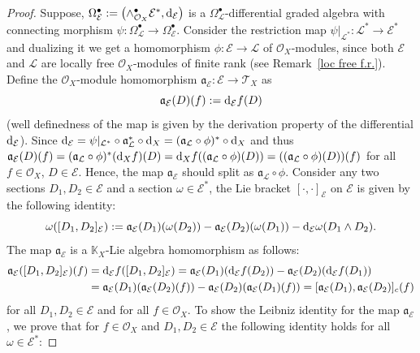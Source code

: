\documentclass[pdftex]{sigma}
\numberwithin{equation}{section}
\theoremstyle{definition}
\begin{document}
\begin{proof}
Suppose, $\Omega^{\bullet}_{\mathcal{E}}:=\bigl(\wedge^{\bullet}_{\mathcal{O}_X}\mathcal{E}^*,{\rm d}_{\mathcal{E}}\bigr)$ is a $\Omega^{\bullet}_{\mathcal{L}}$-differential graded algebra with connecting morphism $\psi\colon \Omega^{\bullet}_{\mathcal{L}} \rightarrow \Omega^{\bullet}_{\mathcal{E}}$.
	Consider the restriction map $ \psi|_{\mathcal{L}^*}\colon \mathcal{L}^* \rightarrow \mathcal{E}^*$ and dualizing it we get a homomorphism $\phi\colon \mathcal{E}\rightarrow \mathcal{L}$ of $\mathcal{O}_X$-modules, since both $\mathcal{E}$ and $\mathcal{L}$ are locally free $\mathcal{O}_X$-modules of finite rank (see Remark~\ref{loc free f.r.}).
	Define the $\mathcal{O}_X$-module homomorphism
	$\mathfrak{a}_{\mathcal{E}}\colon \mathcal{E}\rightarrow \mathcal{T}_X$ as
\[
\mathfrak{a}_{\mathcal{E}}(D)(f):={\rm d}_{\mathcal{E}}f (D)
\]
	(well definedness of the map is given by the derivation property of the differential ${\rm d}_{\mathcal{E}}$).
	Since ${\rm d}_{\mathcal{E}}=\psi|_{\mathcal{L}^*} \circ \mathfrak{a}_{\mathcal{L}}^* \circ {\rm d}_X= (\mathfrak{a}_{\mathcal{L}}\circ \phi)^* \circ {\rm d}_X$ and thus $\mathfrak{a}_{\mathcal{E}}(D)(f)= (\mathfrak{a}_{\mathcal{L}}\circ \phi)^* ({\rm d}_Xf)(D)={\rm d}_Xf((\mathfrak{a}_{\mathcal{L}}\circ \phi)(D))=((\mathfrak{a}_{\mathcal{L}}\circ \phi)(D))(f)$ for all $f \in \mathcal{O}_X$, $D\in \mathcal{E}$. Hence, the map
	$\mathfrak{a}_{\mathcal{E}}$ should split as $\mathfrak{a}_{\mathcal{L}}\circ \phi$.
	Consider any two sections $D_1, D_2 \in \mathcal{E}$ and a section $\omega \in \mathcal{E}^*$, the Lie bracket $[\cdot,\cdot]_{\mathcal{E}}$ on $\mathcal{E}$ is given by the following identity:
\[
\omega([D_1, D_2]_{\mathcal{E}}):= \mathfrak{a}_{\mathcal{E}}(D_1)(\omega(D_2))- \mathfrak{a}_{\mathcal{E}}(D_2)(\omega(D_1))- {\rm d}_{\mathcal{E}}\omega (D_1 \wedge D_2).
\]
	The map $\mathfrak{a}_{\mathcal{E}}$ is a $\mathbb{K}_X$-Lie algebra homomorphism as follows:
\begin{align*}
\mathfrak{a}_{\mathcal{E}}([D_1,D_2]_{\mathcal{E}})(f)&={\rm d}_{\mathcal{E}}f([D_1,D_2]_{\mathcal{E}}) =\mathfrak{a}_{\mathcal{E}}(D_1)({\rm d}_{\mathcal{E}}f(D_2))-\mathfrak{a}_{\mathcal{E}}(D_2)({\rm d}_{\mathcal{E}}f(D_1))\\
& =\mathfrak{a}_{\mathcal{E}}(D_1)(\mathfrak{a}_{\mathcal{E}}(D_2)(f)) -\mathfrak{a}_{\mathcal{E}}(D_2)(\mathfrak{a}_{\mathcal{E}}(D_1)(f)) =[\mathfrak{a}_{\mathcal{E}}(D_1),\mathfrak{a}_{\mathcal{E}}(D_2)]_c(f)
\end{align*}
	for all $D_1,D_2 \in \mathcal{E}$ and for all $f \in \mathcal{O}_X$.
	To show the Leibniz identity for the map $\mathfrak{a}_{\mathcal{E}}$, we prove that for $f \in \mathcal{O}_X$ and $D_1,D_2 \in \mathcal{E}$ the following identity holds for all $\omega \in \mathcal{E}^*$:

\end{proof}
\end{document}
